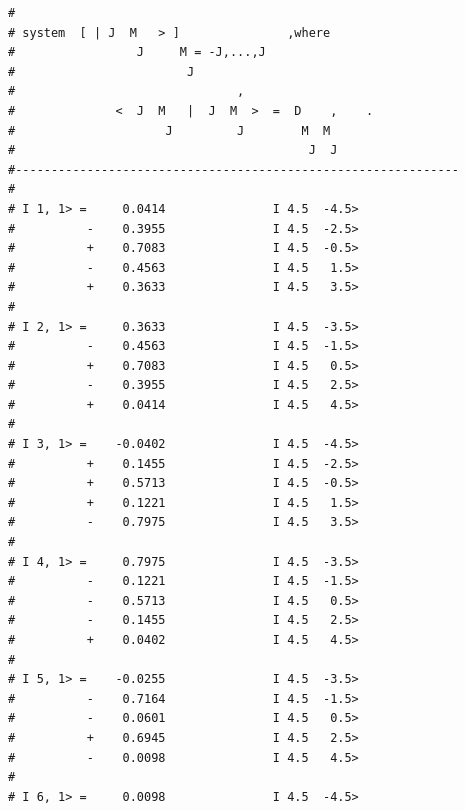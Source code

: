 \begin{enumerate}
{\begin{verbatim}
#                                                              
# system  [ | J  M   > ]               ,where                  
#                 J     M = -J,...,J                           
#                        J                                     
#                               ,                              
#              <  J  M   |  J  M  >  =  D    ,    .            
#                     J         J        M  M                  
#                                         J  J                 
#--------------------------------------------------------------
#                                                              
# I 1, 1> =     0.0414               I 4.5  -4.5>              
#          -    0.3955               I 4.5  -2.5>              
#          +    0.7083               I 4.5  -0.5>              
#          -    0.4563               I 4.5   1.5>              
#          +    0.3633               I 4.5   3.5>              
#                                                              
# I 2, 1> =     0.3633               I 4.5  -3.5>              
#          -    0.4563               I 4.5  -1.5>              
#          +    0.7083               I 4.5   0.5>              
#          -    0.3955               I 4.5   2.5>              
#          +    0.0414               I 4.5   4.5>              
#                                                              
# I 3, 1> =    -0.0402               I 4.5  -4.5>              
#          +    0.1455               I 4.5  -2.5>              
#          +    0.5713               I 4.5  -0.5>              
#          +    0.1221               I 4.5   1.5>              
#          -    0.7975               I 4.5   3.5>              
#                                                              
# I 4, 1> =     0.7975               I 4.5  -3.5>              
#          -    0.1221               I 4.5  -1.5>              
#          -    0.5713               I 4.5   0.5>              
#          -    0.1455               I 4.5   2.5>              
#          +    0.0402               I 4.5   4.5>              
#                                                              
# I 5, 1> =    -0.0255               I 4.5  -3.5>              
#          -    0.7164               I 4.5  -1.5>              
#          -    0.0601               I 4.5   0.5>              
#          +    0.6945               I 4.5   2.5>              
#          -    0.0098               I 4.5   4.5>              
#                                                              
# I 6, 1> =     0.0098               I 4.5  -4.5>              

\end{verbatim}}
\end{enumerate}
